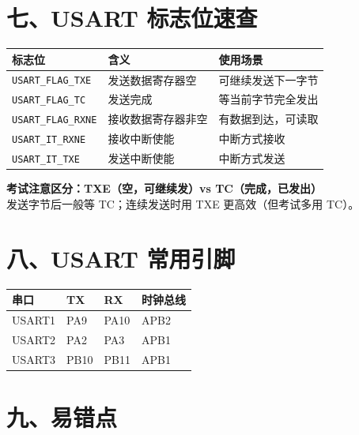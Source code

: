 \documentclass[10pt,a4paper,oneside]{ctexart}
\newcommand{\keyword}[1]{\textcolor{mainblue}{\texttt{#1}}}
\newcommand{\danger}[1]{\textcolor{accent}{\textbf{#1}}}
\begin{document}
\section*{七、USART 标志位速查}

\begin{center}
\begin{tabular}{@{}lll@{}}
    \toprule
    \textbf{标志位} & \textbf{含义} & \textbf{使用场景} \\
    \midrule
    \keyword{USART\_FLAG\_TXE}  & 发送数据寄存器空 & 可继续发送下一字节 \\
    \keyword{USART\_FLAG\_TC}   & 发送完成 & 等当前字节完全发出 \\
    \keyword{USART\_FLAG\_RXNE} & 接收数据寄存器非空 & 有数据到达，可读取 \\
    \keyword{USART\_IT\_RXNE}   & 接收中断使能 & 中断方式接收 \\
    \keyword{USART\_IT\_TXE}    & 发送中断使能 & 中断方式发送 \\
    \bottomrule
\end{tabular}
\end{center}

\begin{warnbox}
    \danger{考试注意区分：TXE（空，可继续发）vs TC（完成，已发出）}\\
    发送字节后一般等 TC；连续发送时用 TXE 更高效（但考试多用 TC）。
\end{warnbox}

\section*{八、USART 常用引脚}

\begin{center}
\begin{tabular}{@{}llll@{}}
    \toprule
    \textbf{串口} & \textbf{TX} & \textbf{RX} & \textbf{时钟总线} \\
    \midrule
    USART1 & PA9  & PA10 & APB2 \\
    USART2 & PA2  & PA3  & APB1 \\
    USART3 & PB10 & PB11 & APB1 \\
    \bottomrule
\end{tabular}
\end{center}

\section*{九、易错点}
\end{document}
